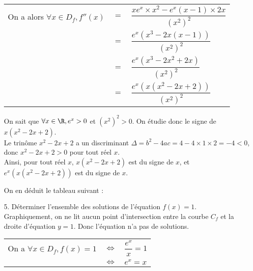 \begin{tabular}{lll}
\hspace{-.3cm} On a alors $\forall x \in D_f, f''(x)$ & $=$ & $\dfrac{xe^x \times x^2 - e^x\left(x-1\right) \times 2x}{\left(x^2\right)^2}$ \vspace*{.3cm} \\
& $=$ & $\dfrac{e^x\left(x^3 -2x\left(x - 1\right)\right)}{\left(x^2\right)^2}$ \vspace*{.3cm} \\
& $=$ & $\dfrac{e^x\left(x^3 - 2x^2 + 2x\right)}{\left(x^2\right)^2}$ \vspace*{.3cm} \\
& $=$ & $\dfrac{e^x\left(x\left(x^2 - 2x + 2\right)\right)}{\left(x^2\right)^2}$ \vspace*{.3cm} \\
\end{tabular}

On sait que $\forall x \in \R, e^x > 0$ et $\left(x^2\right)^2 > 0$. On étudie donc le signe de $x\left(x^2 - 2x + 2\right)$. \\

Le trinôme $x^2 - 2x + 2$ a un discriminant $\Delta = b^2 - 4ac = 4 - 4 \times 1 \times 2 = -4 < 0$, donc $x^2 - 2x + 2 > 0$ pour tout réel $x$. \\

Ainsi, pour tout réel $x$, $x\left(x^2 - 2x + 2\right)$ est du signe de $x$, et $e^x\left(x\left(x^2 - 2x + 2\right)\right)$ est du signe de $x$. 

\newpage

On en déduit le tableau suivant : \\


\vspace*{.3cm}

5. Déterminer l'ensemble des solutions de l'équation $f(x) = 1$. \\

Graphiquement, on ne lit aucun point d'intersection entre la courbe $C_f$ et la droite d'équation $y = 1$. Donc l'équation n'a pas de solutions. \\

\begin{tabular}{lll}
\hspace{-.3cm} On a $\forall x \in D_f, f(x) = 1$ & $\Longleftrightarrow$ & $ \dfrac{e^x}{x} = 1$ \vspace*{.3cm} \\
& $\Longleftrightarrow$ & $e^x = x$ \\
\end{tabular}

